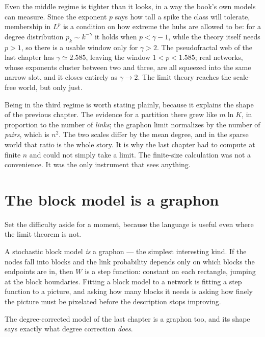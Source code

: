 Even the middle regime is tighter than it looks, in a way the book's own models
can measure. Since the exponent $p$ says how tall a spike the class will
tolerate, membership in $L^p$ is a condition on how extreme the hubs are allowed
to be: for a degree distribution $p_k\sim k^{-\gamma}$ it holds when
$p<\gamma-1$, while the theory itself needs $p>1$, so there is a usable window
only for $\gamma>2$. The
pseudofractal web of the last chapter has $\gamma\simeq2.585$, leaving the window
$1<p<1.585$; real networks, whose exponents cluster between two and three, are all
squeezed into the same narrow slot, and it closes entirely as $\gamma\to2$. The
limit theory reaches the scale-free world, but only just.

Being in the third regime is worth stating plainly, because it explains the shape
of the previous chapter. The evidence for a partition there grew like $m\ln K$, in
proportion to the number of \emph{links}; the graphon limit normalizes by the
number of \emph{pairs}, which is $n^2$. The two scales differ by the mean degree, and in
the sparse world that ratio is the whole story. It is why the last chapter had to
compute at finite $n$ and could not simply take a limit. The finite-size
calculation was not a convenience. It was the only instrument that sees anything.

\section{The block model is a graphon}
\label{sec:gr-blockmodel}

Set the difficulty aside for a moment, because the language is useful even where
the limit theorem is not.

A stochastic block model \emph{is} a graphon --- the simplest interesting kind. If
the nodes fall into blocks and the link probability depends only on which blocks
the endpoints are in, then $W$ is a step function: constant on each rectangle,
jumping at the block boundaries. Fitting a block model to a network is fitting a
step function to a picture, and asking how many blocks it needs is asking how
finely the picture must be pixelated before the description stops improving.

The degree-corrected model of the last chapter is a graphon too, and its shape
says exactly what degree correction \emph{does}.

